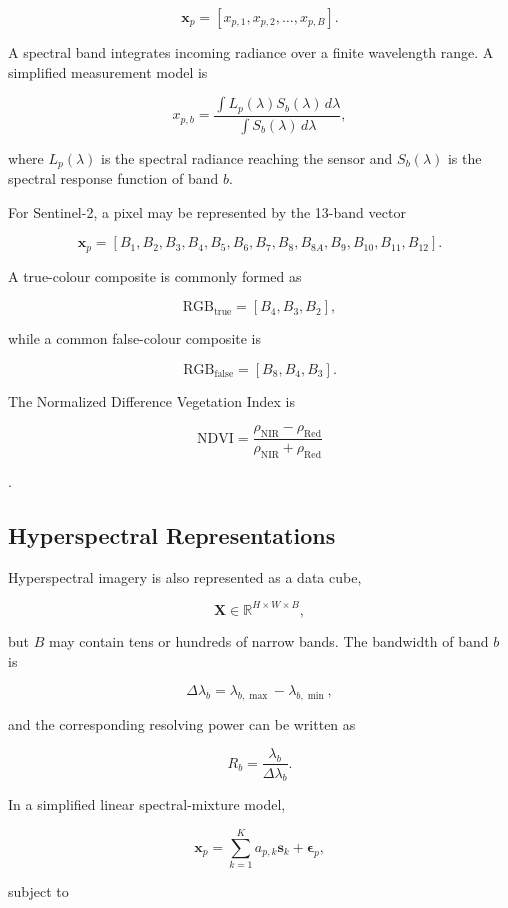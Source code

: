\documentclass[11pt,a4paper]{article}
\begin{document}
\[
\mathbf{x}_p =
\left[
x_{p,1},
x_{p,2},
\ldots,
x_{p,B}
\right].
\]

A spectral band integrates incoming radiance over a finite wavelength
range. A simplified measurement model is

\[
x_{p,b}
=
\frac{
    \int L_p(\lambda)S_b(\lambda)\,d\lambda
}{
    \int S_b(\lambda)\,d\lambda
},
\]

where \(L_p(\lambda)\) is the spectral radiance reaching the sensor and
\(S_b(\lambda)\) is the spectral response function of band \(b\).

For Sentinel-2, a pixel may be represented by the 13-band vector

\[
\mathbf{x}_p =
\left[
B_1,B_2,B_3,B_4,B_5,B_6,B_7,B_8,B_{8A},B_9,B_{10},B_{11},B_{12}
\right].
\]

A true-colour composite is commonly formed as

\[
\mathrm{RGB}_{\mathrm{true}}=[B_4,B_3,B_2],
\]

while a common false-colour composite is

\[
\mathrm{RGB}_{\mathrm{false}}=[B_8,B_4,B_3].
\]

The Normalized Difference Vegetation Index is

\[
\mathrm{NDVI}
=
\frac{\rho_{\mathrm{NIR}}-\rho_{\mathrm{Red}}}
     {\rho_{\mathrm{NIR}}+\rho_{\mathrm{Red}}}
\]

\cite{rouse1974monitoring}.

\subsection{Hyperspectral Representations}

Hyperspectral imagery is also represented as a data cube,

\[
\mathbf{X}\in\mathbb{R}^{H\times W\times B},
\]

but \(B\) may contain tens or hundreds of narrow bands. The bandwidth of
band \(b\) is

\[
\Delta\lambda_b =
\lambda_{b,\max}-\lambda_{b,\min},
\]

and the corresponding resolving power can be written as

\[
R_b=\frac{\lambda_b}{\Delta\lambda_b}.
\]

In a simplified linear spectral-mixture model,

\[
\mathbf{x}_p
=
\sum_{k=1}^{K}a_{p,k}\mathbf{s}_k
+
\boldsymbol{\epsilon}_p,
\]

subject to
\end{document}
